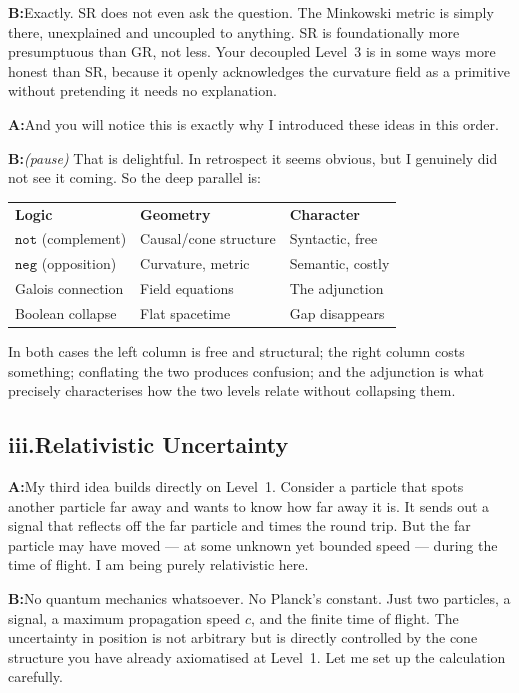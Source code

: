 \documentclass[11pt]{article}
\newcommand{\A}{\medskip\noindent\textbf{A:}\quad}
\newcommand{\B}{\medskip\noindent\textbf{B:}\quad}
\begin{document}
\B Exactly. SR does not even ask the question. The Minkowski metric
is simply there, unexplained and uncoupled to anything. SR is
foundationally more presumptuous than GR, not less. Your decoupled
Level~3 is in some ways more honest than SR, because it openly
acknowledges the curvature field as a primitive without pretending
it needs no explanation.

\A And you will notice this is exactly why I introduced these ideas
in this order.

\B \textit{(pause)} That is delightful. In retrospect it seems
obvious, but I genuinely did not see it coming. So the deep parallel
is:

\medskip
\begin{center}
\begin{tabular}{lll}
\textbf{Logic} & \textbf{Geometry} & \textbf{Character} \\[4pt]
$\texttt{not}$ (complement) & Causal/cone structure & Syntactic, free \\
$\texttt{neg}$ (opposition) & Curvature, metric & Semantic, costly \\
Galois connection & Field equations & The adjunction \\
Boolean collapse & Flat spacetime & Gap disappears \\
\end{tabular}
\end{center}

\medskip
In both cases the left column is free and structural; the right column
costs something; conflating the two produces confusion; and the
adjunction is what precisely characterises how the two levels relate
without collapsing them.

\bigskip
\subsection*{iii.\enspace Relativistic Uncertainty}

\A My third idea builds directly on Level~1. Consider a particle that
spots another particle far away and wants to know how far away it is.
It sends out a signal that reflects off the far particle and times the
round trip. But the far particle may have moved --- at some unknown
yet bounded speed --- during the time of flight. I am being purely
relativistic here.

\B No quantum mechanics whatsoever. No Planck's constant. Just two
particles, a signal, a maximum propagation speed $c$, and the finite
time of flight. The uncertainty in position is not arbitrary but is
directly controlled by the cone structure you have already axiomatised
at Level~1. Let me set up the calculation carefully.
\end{document}
